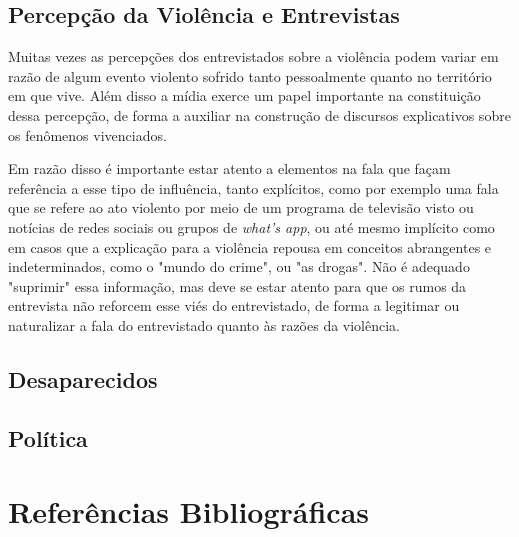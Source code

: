 \subsection{Percepção da Violência e Entrevistas}

Muitas vezes as percepções dos entrevistados sobre a violência podem variar em razão de algum evento violento sofrido tanto pessoalmente quanto no território em que vive. Além disso a mídia exerce um papel importante na constituição dessa percepção, de forma a auxiliar na construção de discursos explicativos sobre os fenômenos vivenciados.

Em razão disso é importante estar atento a elementos na fala que façam referência a esse tipo de influência, tanto explícitos, como por exemplo uma fala que se refere ao ato violento por meio de um programa de televisão visto ou notícias de redes sociais ou grupos de \textit{what's app}, ou até mesmo implícito como em casos que a explicação para a violência repousa em conceitos abrangentes e indeterminados, como o "mundo do crime", ou "as drogas". Não é adequado "suprimir" essa informação, mas deve se estar atento para que os rumos da entrevista não reforcem esse viés do entrevistado, de forma a legitimar ou naturalizar a fala do entrevistado quanto às razões da violência.

\subsection{Desaparecidos}

\subsection{Política}



\section{Referências Bibliográficas}